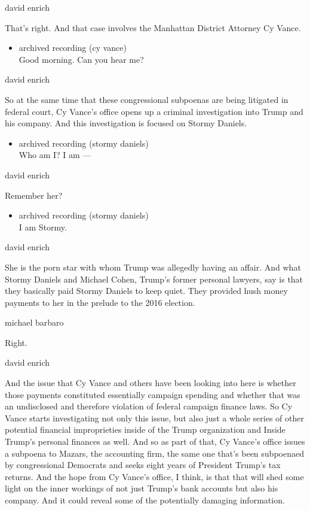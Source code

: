 david enrich

That's right. And that case involves the Manhattan District Attorney Cy
Vance.

\begin{itemize}
\tightlist
\item
  archived recording (cy vance)\\
  Good morning. Can you hear me?
\end{itemize}

david enrich

So at the same time that these congressional subpoenas are being
litigated in federal court, Cy Vance's office opens up a criminal
investigation into Trump and his company. And this investigation is
focused on Stormy Daniels.

\begin{itemize}
\tightlist
\item
  archived recording (stormy daniels)\\
  Who am I? I am ---
\end{itemize}

david enrich

Remember her?

\begin{itemize}
\tightlist
\item
  archived recording (stormy daniels)\\
  I am Stormy.
\end{itemize}

david enrich

She is the porn star with whom Trump was allegedly having an affair. And
what Stormy Daniels and Michael Cohen, Trump's former personal lawyers,
say is that they basically paid Stormy Daniels to keep quiet. They
provided hush money payments to her in the prelude to the 2016 election.

michael barbaro

Right.

david enrich

And the issue that Cy Vance and others have been looking into here is
whether those payments constituted essentially campaign spending and
whether that was an undisclosed and therefore violation of federal
campaign finance laws. So Cy Vance starts investigating not only this
issue, but also just a whole series of other potential financial
improprieties inside of the Trump organization and Inside Trump's
personal finances as well. And so as part of that, Cy Vance's office
issues a subpoena to Mazars, the accounting firm, the same one that's
been subpoenaed by congressional Democrats and seeks eight years of
President Trump's tax returns. And the hope from Cy Vance's office, I
think, is that that will shed some light on the inner workings of not
just Trump's bank accounts but also his company. And it could reveal
some of the potentially damaging information.

